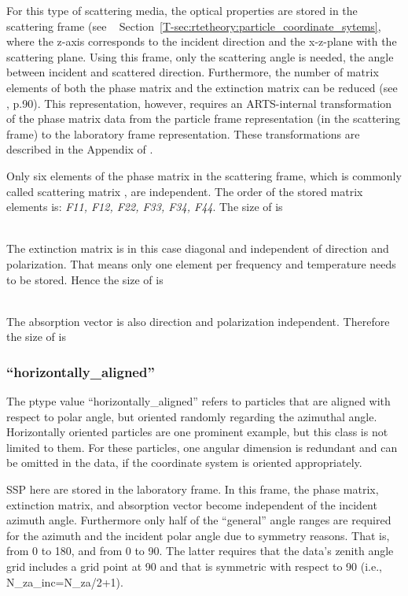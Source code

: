 For this type of scattering media, the optical properties are
stored in the scattering frame (see \theory~%
Section~\ref{T-sec:rtetheory:particle_coordinate_sytems}, where the z-axis
corresponds to the incident direction and the x-z-plane with the scattering
plane. Using this frame, only the scattering angle is needed, the angle between
incident and scattered direction. Furthermore, the number of matrix elements of
both the phase matrix and the extinction matrix can be reduced (see
\citet{Mishchenko:02}, p.90). This representation, however, requires an
ARTS-internal transformation of the phase matrix data from the particle frame
representation (in the scattering frame) to the laboratory frame representation.
These transformations are described in the Appendix of
\citet{emde05:_phdthesis}.

Only six elements of the phase matrix in the scattering frame, which is commonly
called scattering matrix \ScaMat, are independent. The order of the stored matrix
elements is: {\sl F11, F12, F22, F33, F34, F44}. The size of
 is

\shortcode{[N\_f N\_T N\_za\_sca 1 1 1 6]}\\
%
The extinction matrix is in this case diagonal and independent of direction and
polarization. That means only one element per frequency and temperature needs to
be stored. Hence the size of  is

\shortcode{[N\_f N\_T 1 1 1]}\\
%
The absorption vector is also direction and polarization independent. Therefore
the size of  is

\shortcode{[N\_f N\_T 1 1 1]}


\subsubsection{``horizontally\_aligned''}
The ptype value ``horizontally\_aligned'' refers to particles that are
aligned with respect to polar angle, but oriented randomly regarding the
azimuthal angle. Horizontally oriented particles are one prominent example, but
this class is not limited to them. For these particles, one angular dimension is
redundant and can be omitted in the data, if the coordinate system is oriented
appropriately.

SSP here are stored in the laboratory frame. In this frame, the phase matrix,
extinction matrix, and absorption vector become independent of the incident
azimuth angle. Furthermore only half of the ``general'' angle ranges are
required for the azimuth and the incident polar angle due to symmetry reasons.
That is,  from 0\degree{} to 180\degree{}, and
 from 0\degree{} to 90\degree{}. The latter requires that the
data's zenith angle grid includes a grid point at 90\degree{} and that
 is symmetric with respect to 90\degree{} (i.e.,
N\_za\_inc=N\_za/2+1).

